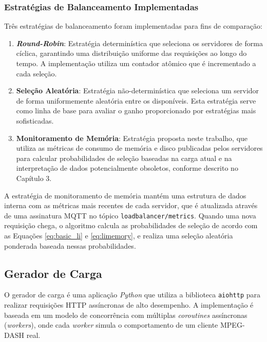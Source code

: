 \subsubsection{Estratégias de Balanceamento Implementadas}

Três estratégias de balanceamento foram implementadas para fins de comparação:

\begin{enumerate}
    \item \textbf{\textit{Round-Robin}}: Estratégia determinística que seleciona os servidores de forma cíclica, garantindo uma distribuição uniforme das requisições ao longo do tempo. A implementação utiliza um contador atômico que é incrementado a cada seleção.
    
    \item \textbf{Seleção Aleatória}: Estratégia não-determinística que seleciona um servidor de forma uniformemente aleatória entre os disponíveis. Esta estratégia serve como linha de base para avaliar o ganho proporcionado por estratégias mais sofisticadas.
    
    \item \textbf{Monitoramento de Memória}: Estratégia proposta neste trabalho, que utiliza as métricas de consumo de memória e disco publicadas pelos servidores para calcular probabilidades de seleção baseadas na carga atual e na interpretação de dados potencialmente obsoletos, conforme descrito no Capítulo 3.
\end{enumerate}

A estratégia de monitoramento de memória mantém uma estrutura de dados interna com as métricas mais recentes de cada servidor, que é atualizada através de uma assinatura MQTT no tópico \texttt{loadbalancer/metrics}. Quando uma nova requisição chega, o algoritmo calcula as probabilidades de seleção de acordo com as Equações \ref{eq:basic_li} e \ref{eq:limemory}, e realiza uma seleção aleatória ponderada baseada nessas probabilidades.

\subsection{Gerador de Carga}

O gerador de carga é uma aplicação \textit{Python} que utiliza a biblioteca \texttt{aiohttp} para realizar requisições HTTP assíncronas de alto desempenho. A implementação é baseada em um modelo de concorrência com múltiplas \textit{coroutines} assíncronas (\textit{workers}), onde cada \textit{worker} simula o comportamento de um cliente MPEG-DASH real.

